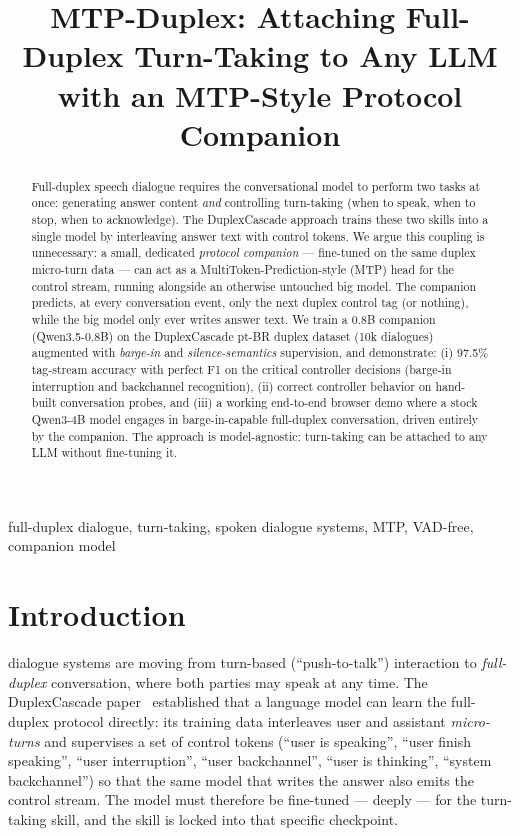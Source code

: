 \documentclass[conference]{IEEEtran}
\title{MTP-Duplex: Attaching Full-Duplex Turn-Taking to Any LLM with an MTP-Style Protocol Companion}
\author{\IEEEauthorblockN{Penhfel et al.}
\IEEEauthorblockA{\textit{private project — custom-duplex-cascade-pt-br/mtp\_like}}}
\begin{document}
\maketitle

\begin{abstract}
Full-duplex speech dialogue requires the conversational model to perform two
tasks at once: generating answer content \emph{and} controlling turn-taking
(when to speak, when to stop, when to acknowledge). The DuplexCascade approach
trains these two skills into a single model by interleaving answer text with
control tokens. We argue this coupling is unnecessary: a small, dedicated
\emph{protocol companion} — fine-tuned on the same duplex micro-turn data —
can act as a MultiToken-Prediction-style (MTP) head for the control stream,
running alongside an otherwise untouched big model. The companion predicts,
at every conversation event, only the next duplex control tag (or nothing),
while the big model only ever writes answer text. We train a 0.8B companion
(Qwen3.5-0.8B) on the DuplexCascade pt-BR duplex dataset (10k dialogues)
augmented with \emph{barge-in} and \emph{silence-semantics} supervision, and
demonstrate: (i) 97.5\% tag-stream accuracy with perfect F1 on the critical
controller decisions (barge-in interruption and backchannel recognition),
(ii) correct controller behavior on hand-built conversation probes, and
(iii) a working end-to-end browser demo where a stock Qwen3-4B model engages
in barge-in-capable full-duplex conversation, driven entirely by the
companion. The approach is model-agnostic: turn-taking can be attached to any
LLM without fine-tuning it.
\end{abstract}

\begin{IEEEkeywords}
full-duplex dialogue, turn-taking, spoken dialogue systems, MTP,
VAD-free, companion model
\end{IEEEkeywords}

\section{Introduction}
 dialogue systems are moving from turn-based
(``push-to-talk'') interaction to \emph{full-duplex} conversation, where both
parties may speak at any time. The DuplexCascade paper~\cite{duplexcascade}
established that a language model can learn the full-duplex protocol directly:
its training data interleaves user and assistant \emph{micro-turns} and
supervises a set of control tokens (``user is speaking'', ``user finish
speaking'', ``user interruption'', ``user backchannel'', ``user is
thinking'', ``system backchannel'') so that the same model that writes the
answer also emits the control stream. The model must therefore be
fine-tuned — deeply — for the turn-taking skill, and the skill is locked into
that specific checkpoint.
\end{document}

